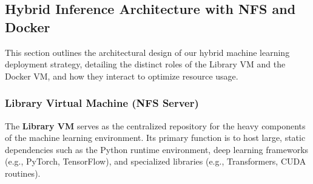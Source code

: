 \documentclass{ieeeaccess}
\begin{document}


\subsection{Hybrid Inference Architecture with NFS and Docker}

This section outlines the architectural design of our hybrid machine learning deployment strategy, detailing the distinct roles of the Library VM and the Docker VM, and how they interact to optimize resource usage.

\subsubsection{Library Virtual Machine (NFS Server)}

The \textbf{Library VM} serves as the centralized repository for the heavy components of the machine learning environment. Its primary function is to host large, static dependencies such as the Python runtime environment, deep learning frameworks (e.g., PyTorch, TensorFlow), and specialized libraries (e.g., Transformers, CUDA routines).
\end{document}
